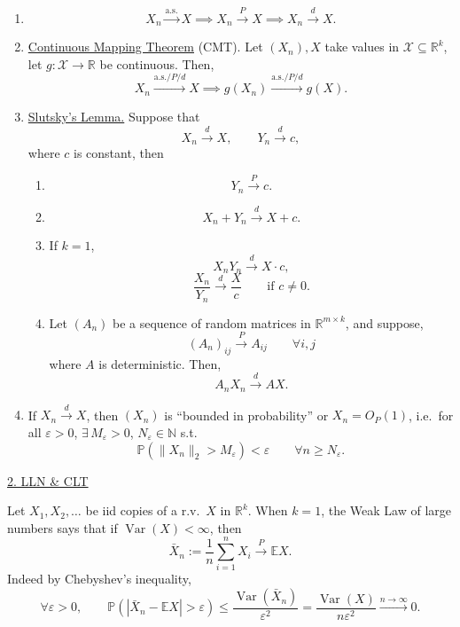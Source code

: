 \documentclass[11pt,a4paper]{article}
\begin{document}
\begin{enumerate}
    \item[(a)]
    \[
    X_n\xrightarrow{\mathrm{a.s.}}X
    \implies
    X_n\xrightarrow{P}X
    \implies
    X_n\xrightarrow{d}X.
    \]

    \item[(b)]
    \underline{Continuous Mapping Theorem} (CMT).
    Let $(X_n),X$ take values in
    $\mathcal{X}\subseteq\mathbb{R}^k$,
    let $g:\mathcal{X}\to\mathbb{R}$ be continuous.
    Then,
    \[
    X_n\xrightarrow{\mathrm{a.s.}/P/d}X
    \implies
    g(X_n)\xrightarrow{\mathrm{a.s.}/P/d}g(X).
    \]

    \item[(c)]
    \underline{Slutsky's Lemma.}
    Suppose that
    \[
    X_n\xrightarrow{d}X,
    \qquad
    Y_n\xrightarrow{d}c,
    \]
    where $c$ is constant, then
    \begin{enumerate}
        \item[(i)]
        \[
        Y_n\xrightarrow{P}c.
        \]

        \item[(ii)]
        \[
        X_n+Y_n\xrightarrow{d}X+c.
        \]

        \item[(iii)]
        If $k=1$,
        \[
        X_nY_n\xrightarrow{d}X\cdot c,
        \]
        \[
        \frac{X_n}{Y_n}\xrightarrow{d}\frac{X}{c}
        \qquad\text{if }c\neq0.
        \]

        \item[(iv)]
        Let $(A_n)$ be a sequence of random matrices in
        $\mathbb{R}^{m\times k}$, and suppose,
        \[
        (A_n)_{ij}\xrightarrow{P}A_{ij}
        \qquad \forall i,j
        \]
        where $A$ is deterministic. Then,
        \[
        A_nX_n\xrightarrow{d}AX.
        \]
    \end{enumerate}

    \item[(d)]
    If $X_n\xrightarrow{d}X$, then $(X_n)$ is
    ``bounded in probability'' or $X_n=O_P(1)$, i.e.\
    for all $\varepsilon>0$,
    $\exists\,M_\varepsilon>0$, $N_\varepsilon\in\mathbb{N}$ s.t.
    \[
    \mathbb{P}\left(\|X_n\|_2>M_\varepsilon\right)
    <\varepsilon
    \qquad \forall n\geq N_\varepsilon.
    \]
\end{enumerate}

\medskip
\noindent
\underline{2. LLN \& CLT}

\medskip
\noindent
Let $X_1,X_2,\ldots$ be iid copies of a r.v.\ $X$ in
$\mathbb{R}^k$.
When $k=1$, the Weak Law of large numbers says that if
$\operatorname{Var}(X)<\infty$, then
\[
\bar{X}_n:=\frac{1}{n}\sum_{i=1}^n X_i
\xrightarrow{P}\mathbb{E}X.
\]
Indeed by Chebyshev's inequality,
\[
\forall\varepsilon>0,\qquad
\mathbb{P}\left(
|\bar{X}_n-\mathbb{E}X|>\varepsilon
\right)
\leq
\frac{\operatorname{Var}(\bar{X}_n)}{\varepsilon^2}
=
\frac{\operatorname{Var}(X)}{n\varepsilon^2}
\xrightarrow{n\to\infty}0.
\]
\end{document}
